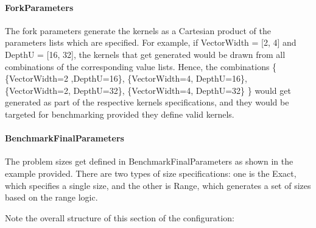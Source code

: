\documentclass[]{article}
\begin{document}
\label{sec:forkParams}
\paragraph{ForkParameters} The fork parameters generate the kernels as a Cartesian product of the parameters lists which are specified. For example, if VectorWidth = [2, 4] and DepthU = [16, 32], the kernels that get generated would be drawn from all combinations of the corresponding value lists. Hence, the combinations \{ \{VectorWidth=2 ,DepthU=16\}, \{VectorWidth=4, DepthU=16\},  \{VectorWidth=2, DepthU=32\}, \{VectorWidth=4, DepthU=32\} \} would get generated as part of the respective kernels specifications, and they would be targeted for benchmarking provided they define valid kernels.

\paragraph{BenchmarkFinalParameters} The problem sizes get defined in BenchmarkFinalParameters as shown in the example provided. There are two types of size specifications: one is the Exact, which specifies a single size, and the other is Range, which generates a set of sizes based on the range logic.

\hfill \break
Note the overall structure of this section of the configuration:

\hfill \break
{}






\end{document}
